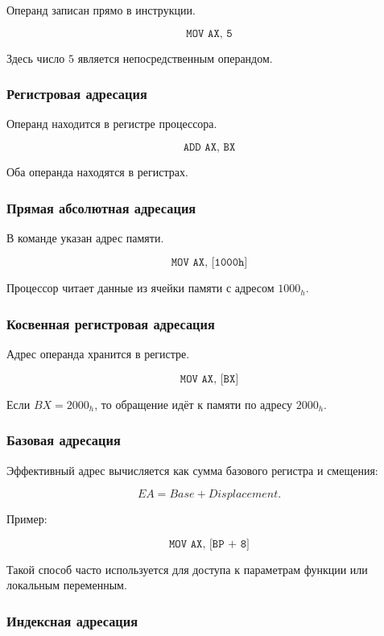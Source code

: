 \documentclass[a4paper,12pt]{article}
\begin{document}
Операнд записан прямо в инструкции.

\[
\texttt{MOV AX, 5}
\]

Здесь число $5$ является непосредственным операндом.

\subsubsection{Регистровая адресация}

Операнд находится в регистре процессора.

\[
\texttt{ADD AX, BX}
\]

Оба операнда находятся в регистрах.

\subsubsection{Прямая абсолютная адресация}

В команде указан адрес памяти.

\[
\texttt{MOV AX, [1000h]}
\]

Процессор читает данные из ячейки памяти с адресом $1000_h$.

\subsubsection{Косвенная регистровая адресация}

Адрес операнда хранится в регистре.

\[
\texttt{MOV AX, [BX]}
\]

Если $BX = 2000_h$, то обращение идёт к памяти по адресу $2000_h$.

\subsubsection{Базовая адресация}

Эффективный адрес вычисляется как сумма базового регистра и смещения:

\[
EA = Base + Displacement.
\]

Пример:

\[
\texttt{MOV AX, [BP + 8]}
\]

Такой способ часто используется для доступа к параметрам функции или локальным переменным.

\subsubsection{Индексная адресация}
\end{document}
